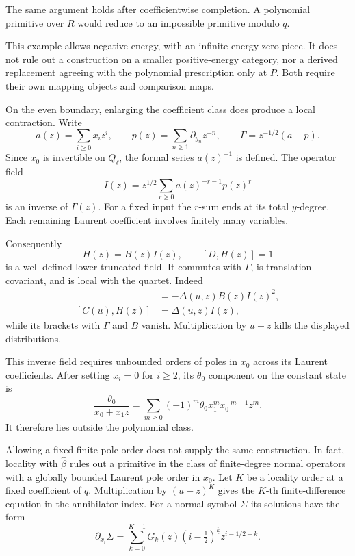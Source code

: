 The same argument holds after coefficientwise completion.
A polynomial primitive over $R$ would reduce to an
impossible primitive modulo $q$.

This example allows negative energy, with an infinite
energy-zero piece. It does not rule out a construction
on a smaller positive-energy category, nor a derived
replacement agreeing with the polynomial prescription
only at $P$. Both require their own mapping objects
and comparison maps.

On the even boundary, enlarging the coefficient class
does produce a local contraction. Write
\[
 a(z)=\sum_{i\geq0}x_i z^i,\qquad
 p(z)=\sum_{n\geq1}\partial_{y_n}z^{-n},\qquad
 \Gamma=z^{-1/2}(a-p).
\]
Since $x_0$ is invertible on $Q_\ell$, the formal series
$a(z)^{-1}$ is defined. The operator field
\[
 I(z)=z^{1/2}\sum_{r\geq0}a(z)^{-r-1}p(z)^r
\]
is an inverse of $\Gamma(z)$. For a fixed input the
$r$-sum ends at its total $y$-degree. Each remaining
Laurent coefficient involves finitely many variables.

Consequently
\[
 H(z)=B(z)I(z),\qquad [D,H(z)]=1
\]
is a well-defined lower-truncated field. It commutes
with $\Gamma$, is translation covariant, and is local
with the quartet. Indeed
\begin{align*}
 [\widehat\beta(u),H(z)]&=-\Delta(u,z)B(z)I(z)^2,\\
 [C(u),H(z)]&=\Delta(u,z)I(z),
\end{align*}
while its brackets with $\Gamma$ and $B$ vanish.
Multiplication by $u-z$ kills the displayed distributions.

This inverse field requires unbounded orders of poles
in $x_0$ across its Laurent coefficients. After setting
$x_i=0$ for $i\geq2$, its $\theta_0$ component on the
constant state is
\[
 \frac{\theta_0}{x_0+x_1z}
   =\sum_{m\geq0}(-1)^m\theta_0x_1^m x_0^{-m-1}z^m.
\]
It therefore lies outside the polynomial class.

Allowing a fixed finite pole order does not supply
the same construction. In fact, locality with
$\widehat\beta$ rules out a primitive in the class
of finite-degree normal operators with a globally
bounded Laurent pole order in $x_0$. Let $K$ be a
locality order at a fixed coefficient of $q$. Multiplication
by $(u-z)^K$ gives the $K$-th finite-difference equation
in the annihilator index. For a normal symbol $\Sigma$
its solutions have the form
\[
 \partial_{x_i}\Sigma
 =\sum_{k=0}^{K-1}G_k(z)(i-\tfrac12)^{\underline{k}}
                              z^{i-1/2-k}.
\]


